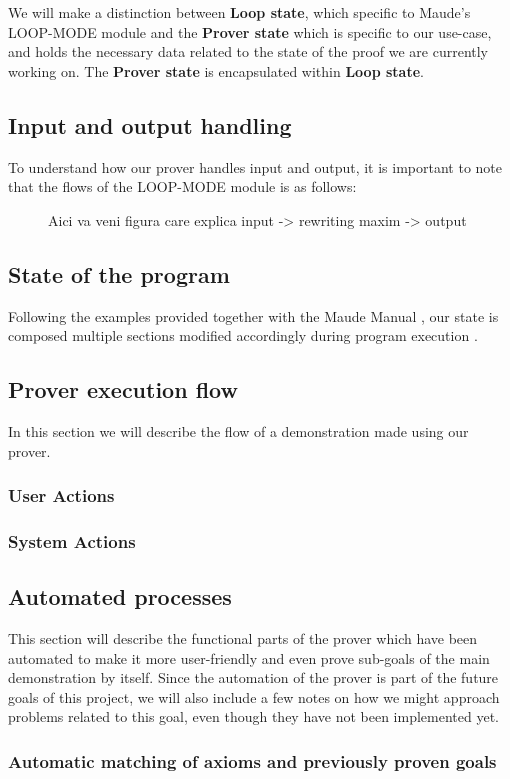 \documentclass[12pt,a4paper]{article}
\begin{document}
We will make a distinction between \textbf{Loop state}, which specific to Maude's LOOP-MODE module and the \textbf{Prover state} which is specific to our use-case, and holds the necessary data related to the state of the proof we are currently working on. The \textbf{Prover state} is encapsulated within \textbf{Loop state}.
\subsection{Input and output handling}
To understand how our prover handles input and output, it is important to note that the flows of the LOOP-MODE module is as follows: 
\begin{figure}
	Aici va veni figura care explica input -> rewriting maxim -> output
\end{figure}
\subsection{State of the program}
Following the examples provided together with the Maude Manual \cite{manual}, our state is composed multiple sections modified accordingly during program execution .
\subsection{Prover execution flow}
In this section we will describe the flow of a demonstration made using our prover.
\subsubsection{User Actions}
\subsubsection{System Actions}
\subsection{Automated processes}
This section will describe the functional parts of the prover which have been automated to make it more user-friendly and even prove sub-goals of the main demonstration by itself. Since the automation of the prover is part of the future goals of this project, we will also include a few notes on how we might approach problems related to this goal, even though they have not been implemented yet.
\subsubsection{Automatic matching of axioms and previously proven goals}
\end{document}
